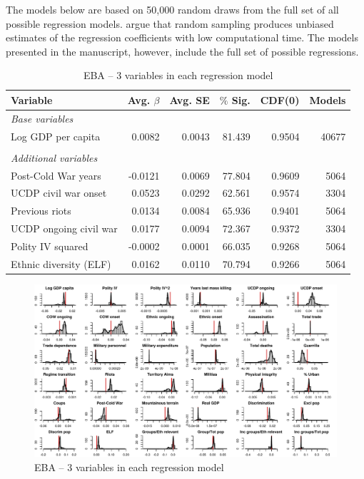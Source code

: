 The models below are based on 50,000 random draws from the full set of all possible regression models. \citet[819]{salaimartin2004determinants} argue that random sampling produces unbiased estimates of the regression coefficients with low computational time. The models presented in the manuscript, however, include the full set of possible regressions.

\vspace{1cm}

\begin{table}[H]
\centering
\begin{tabular}{lrrrrr}
\hline
\textbf{Variable} & \textbf{Avg. $\beta$} & \textbf{Avg. SE} & \textbf{$\%$ Sig.} & \textbf{CDF(0)} & \textbf{Models} \\ \hline
\textit{Base variables} &  &  &  &  &  \\
Log GDP per capita & 0.0082 & 0.0043 & 81.439 & 0.9504 & 40677 \\
 &  &  &  &  &  \\
\textit{Additional variables} &  &  &  &  &  \\
Post-Cold War years & -0.0121 & 0.0069 & 77.804 & 0.9609 & 5064 \\
UCDP civil war onset & 0.0523 & 0.0292 & 62.561 & 0.9574 & 3304 \\
Previous riots &0.0134 & 0.0084 & 65.936 & 0.9401 & 5064 \\
UCDP ongoing civil war & 0.0177 & 0.0094 & 72.367 & 0.9372 & 3304 \\
Polity IV squared & -0.0002 & 0.0001 & 66.035 & 0.9268 & 5064 \\ 
Ethnic diversity (ELF) & 0.0162 & 0.0110 & 70.794 & 0.9266 & 5064 \\\hline
\end{tabular}
\caption{EBA -- 3 variables in each regression model}
\label{tab:mk-3vars}
\end{table}

\clearpage
\begin{figure}
    \centering
    \includegraphics[width=\textwidth]{images/mk-3vars.pdf}
    \caption{EBA -- 3 variables in each regression model}
    \label{fig:mk-3vars}
\end{figure}
\clearpage

